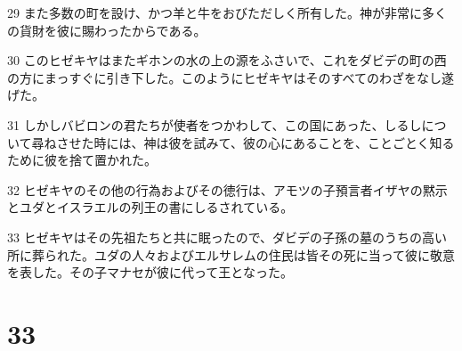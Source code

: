 \par 29 また多数の町を設け、かつ羊と牛をおびただしく所有した。神が非常に多くの貨財を彼に賜わったからである。
\par 30 このヒゼキヤはまたギホンの水の上の源をふさいで、これをダビデの町の西の方にまっすぐに引き下した。このようにヒゼキヤはそのすべてのわざをなし遂げた。
\par 31 しかしバビロンの君たちが使者をつかわして、この国にあった、しるしについて尋ねさせた時には、神は彼を試みて、彼の心にあることを、ことごとく知るために彼を捨て置かれた。
\par 32 ヒゼキヤのその他の行為およびその徳行は、アモツの子預言者イザヤの黙示とユダとイスラエルの列王の書にしるされている。
\par 33 ヒゼキヤはその先祖たちと共に眠ったので、ダビデの子孫の墓のうちの高い所に葬られた。ユダの人々およびエルサレムの住民は皆その死に当って彼に敬意を表した。その子マナセが彼に代って王となった。

\chapter{33}

